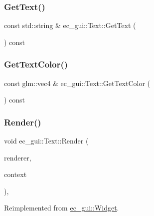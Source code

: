 \subsubsection{\texorpdfstring{Get\+Text()}{GetText()}}
{\footnotesize\ttfamily const std\+::string \& ec\+\_\+gui\+::\+Text\+::\+Get\+Text (\begin{DoxyParamCaption}{ }\end{DoxyParamCaption}) const}

\mbox{\label{classec__gui_1_1_text_a6b0c127b16a36144078fbf0c8c069931}} 
\subsubsection{\texorpdfstring{Get\+Text\+Color()}{GetTextColor()}}
{\footnotesize\ttfamily const glm\+::vec4 \& ec\+\_\+gui\+::\+Text\+::\+Get\+Text\+Color (\begin{DoxyParamCaption}{ }\end{DoxyParamCaption}) const}

\mbox{\label{classec__gui_1_1_text_a3dab94a21f6fbe9d27f0591b5a5b196b}} 
\subsubsection{\texorpdfstring{Render()}{Render()}}
{\footnotesize\ttfamily void ec\+\_\+gui\+::\+Text\+::\+Render (\begin{DoxyParamCaption}\item[{\mbox{\hyperlink{classec__gui_1_1_g_u_i_renderer}{G\+U\+I\+Renderer}} \&}]{renderer,  }\item[{\mbox{\hyperlink{classec__gui_1_1_g_u_i_rendering_context}{G\+U\+I\+Rendering\+Context}} \&}]{context }\end{DoxyParamCaption})\hspace{0.3cm}{\ttfamily [override]}, {\ttfamily [virtual]}}



Reimplemented from \mbox{\hyperlink{classec__gui_1_1_widget_a5a8b9275293ea433e6ba8fec3e7b5232}{ec\+\_\+gui\+::\+Widget}}.

